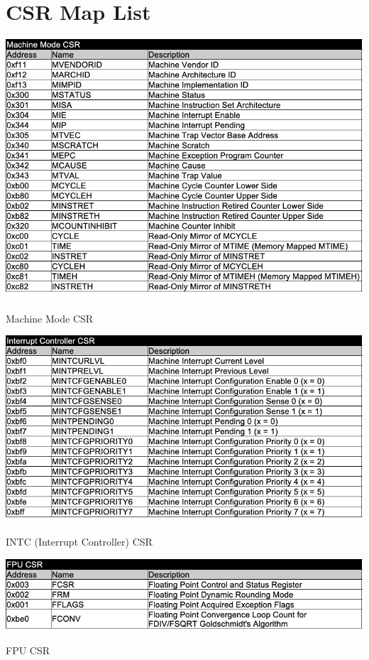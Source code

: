 \section{CSR Map List}

\begin{table}[H]
    \includegraphics[width=1.00\columnwidth]{./Table/CSR_MMODE.png}
    \caption{Machine Mode CSR}
    \label{tb:CSR_MMODE}
\end{table}

\begin{table}[H]
    \includegraphics[width=1.00\columnwidth]{./Table/CSR_INTC.png}
    \caption{INTC (Interrupt Controller) CSR}
    \label{tb:CSR_INTC}
\end{table}

\begin{table}[H]
    \includegraphics[width=1.00\columnwidth]{./Table/CSR_FPU.png}
    \caption{FPU CSR}
    \label{tb:CSR_FPU}
\end{table}


